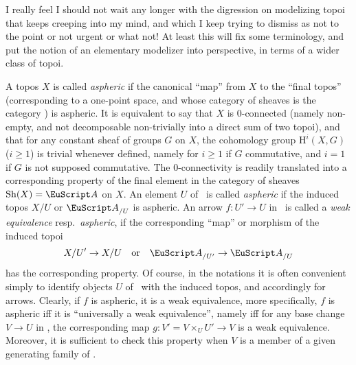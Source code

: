 \bigbreak

\noindent\hfill{}\par

\label{sec:35}%
I really feel I should not wait any longer with the digression on
modelizing topoi that keeps creeping into my mind, and which I keep
trying to dismiss as not to the point or not urgent or what not! At
least this will fix some terminology, and put the notion of an
elementary modelizer into perspective, in terms of a wider class of
topoi.

A topos $X$ is called \emph{aspheric} if the canonical ``map'' from
$X$ to the ``final topos'' (corresponding to a one-point space, and
whose category of sheaves is the category \Sets) is aspheric. It is
equivalent to say that $X$ is $0$-connected (namely non-empty, and not
decomposable non-trivially into a direct sum of two topoi), and that
for any constant sheaf of groups $G$ on $X$, the
cohomology group $\mathrm H^i(X,G)$ ($i\ge1$) is trivial whenever defined,
namely for $i\ge1$ if $G$ commutative, and $i=1$ if $G$ is not
supposed commutative. The $0$-connectivity is readily translated into
a corresponding property of the final element in the category of
sheaves $\Sh(X)=\scrA$ on $X$. An element $U$ of \scrA\ is called
\emph{aspheric} if the induced topos $X/U$ or $\scrA_{/U}$ is
aspheric. An arrow $f : U' \to U$ in \scrA\ is called a \emph{weak
  equivalence} resp.\ \emph{aspheric}, if the corresponding ``map'' or
morphism of the induced topoi
\[ X/U'\to X/U \quad\text{or}\quad \scrA_{/U'}\to\scrA_{/U} \]
has the corresponding property. Of course, in the notations it is
often convenient simply to identify objects $U$ of \scrA\ with the
induced topos, and accordingly for arrows. Clearly, if $f$ is aspheric,
it is a weak equivalence, more specifically, $f$ is aspheric if{f} it
is ``universally a weak equivalence'', namely if{f} for any base
change $V\to U$ in \scrA, the corresponding map $g: V'=V\times_U U'\to
V$ is a weak equivalence. Moreover, it is sufficient to check this
property when $V$ is a member of a given generating family of \scrA.

